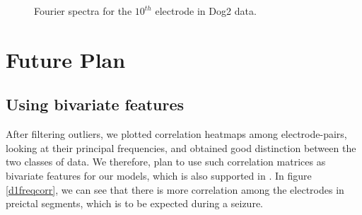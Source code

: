 \documentclass[a4paper]{article}
\begin{document}
\begin{figure}[H]
	\centering
	\qquad
	\caption{Fourier spectra for the $10^{th}$ electrode in Dog2 data.}
	\label{d2e10spec}
\end{figure}

\section{Future Plan}
\subsection{Using bivariate features}
After filtering outliers, we plotted correlation heatmaps among electrode-pairs, looking at their principal frequencies, and obtained good distinction between the two classes of data. We therefore, plan to use such correlation matrices as bivariate features for our models, which is also supported in \cite{lecun}. In figure \ref{d1freqcorr}, we can see that there is more correlation among the electrodes in preictal segments, which is to be expected during a seizure.
\end{document}
